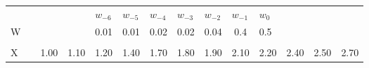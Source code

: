 \begin{frame}
\begin{columns}
\begin{overlayarea}{\textwidth}{\textheight}
\begin{minipage}[t]{0.25\textwidth}
{\begin{table}[h]
{\begin{tabular}{p{0.1cm}p{0.1cm}p{0.1cm}p{0.1cm}p{0.1cm}p{0.1cm}p{0.1cm}p{0.1cm}p{0.1cm}p{0.1cm}p{0.1cm}p{0.1cm}p{0.1cm}p{0.1cm}}
								                     &                       &                           &                           & $w_{-6}$                  & $w_{-5}$                  & $w_{-4}$                  & $w_{-3}$                                         & $w_{-2}$                                         & $w_{-1}$                                         & $w_{0}$                                          &                                                  &                                                  &                                                  \\ \cline{8-11}
								\cline{5-11}
								W                    &                       &                           & \multicolumn{1}{c|}{}     & \multicolumn{1}{c|}{0.01} & \multicolumn{1}{c|}{0.01} & \multicolumn{1}{c|}{0.02} & \multicolumn{1}{c|}{0.02}                        & \multicolumn{1}{c|}{0.04}                        & \multicolumn{1}{c|}{0.4}                         & \multicolumn{1}{l|}{0.5}                         &                                                  &                                                  &                                                  \\ \cline{5-11}
								\multicolumn{1}{l}{} &                       & \multicolumn{1}{l}{}      & \multicolumn{1}{l}{}      & \multicolumn{1}{l}{}      & \multicolumn{1}{l}{}      & \multicolumn{1}{l}{}      & \multicolumn{1}{l}{}                             & \multicolumn{1}{l}{}                             & \multicolumn{1}{l}{}                             &                                                  &                                                  &                                                  &                                                  \\ \cline{3-14} 
								X                    & \multicolumn{1}{l|}{} & \multicolumn{1}{c|}{1.00} & \multicolumn{1}{c|}{1.10} & \multicolumn{1}{c|}{1.20} & \multicolumn{1}{c|}{1.40} & \multicolumn{1}{c|}{1.70} & \multicolumn{1}{c|}{1.80}                        & \multicolumn{1}{c|}{1.90}                        & \multicolumn{1}{c|}{2.10}                        & \multicolumn{1}{c|}{2.20}                        & \multicolumn{1}{c|}{2.40}                        & \multicolumn{1}{c|}{2.50}                        & \multicolumn{1}{c|}{2.70}                        \\ \cline{3-14} 

\end{tabular}}
\end{table}}
\end{minipage}
\end{overlayarea}
\end{columns}
\end{frame}
